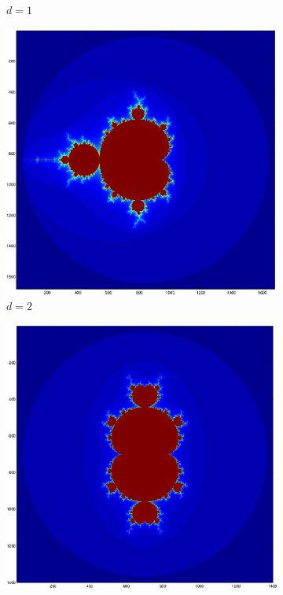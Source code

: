 \documentclass[a4wide, 10pt]{article}
\begin{document}
\begin{figure}[H]
\begin{subfigure}[b]{0.18\textwidth}
                \caption{$d = 1$}
        \end{subfigure}
        \begin{subfigure}[b]{0.18\textwidth}
                \includegraphics[width=\textwidth]{EPSFiles/Mandelbrot_Power_2}
                \caption{$d = 2$}
        \end{subfigure}        
        \begin{subfigure}[b]{0.18\textwidth}
                \includegraphics[width=\textwidth]{EPSFiles/Mandelbrot_Power_3}

\end{subfigure}
\end{figure}
\end{document}
